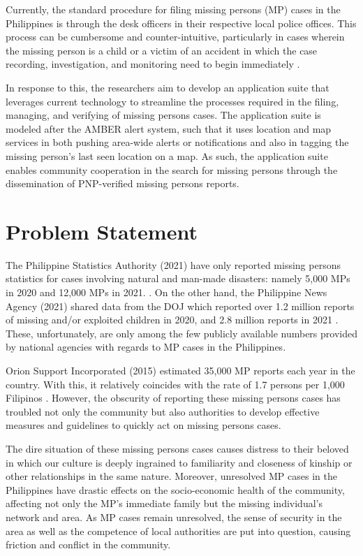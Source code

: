 Currently, the standard procedure for filing missing persons (MP) cases in the Philippines is through the desk officers in their respective local police offices. This process can be cumbersome and counter-intuitive, particularly in cases wherein the missing person is a child or a victim of an accident in which the case recording, investigation, and monitoring need to begin immediately \cite{NationalPoliceCommission}.

In response to this, the researchers aim to develop an application suite that leverages current technology to streamline the processes required in the filing, managing, and verifying of missing persons cases. The application suite is modeled after the AMBER alert system, such that it uses location and map services in both pushing area-wide alerts or notifications and also in tagging the missing person's last seen location on a map. As such, the application suite enables community cooperation in the search for missing persons through the dissemination of PNP-verified missing persons reports. 


\section{Problem Statement}
The Philippine Statistics Authority (2021) have only reported missing persons statistics for cases involving natural and man-made disasters: namely 5,000 MPs in 2020 and 12,000 MPs in 2021. \cite{PSAOpenStat}. On the other hand, the Philippine News Agency (2021) shared data from the DOJ which reported over 1.2 million reports of missing and/or exploited children in 2020, and 2.8 million reports in 2021 \cite{pulta_2021}. These, unfortunately, are only among the few publicly available numbers provided by national agencies with regards to MP cases in the Philippines.

Orion Support Incorporated (2015) estimated 35,000 MP reports each year in the country. With this, it relatively coincides with the rate of 1.7 persons per 1,000 Filipinos \cite{orion_2021}. However, the obscurity of reporting these missing persons cases has troubled not only the community but also authorities to develop effective measures and guidelines to quickly act on missing persons cases.

The dire situation of these missing persons cases causes distress to their beloved in which our culture is deeply ingrained to familiarity and closeness of kinship or other relationships in the same nature.  Moreover, unresolved MP cases in the Philippines have drastic effects on the socio-economic health of the community, affecting not only the MP’s immediate family but the missing individual’s network and area. As MP cases remain unresolved, the sense of security in the area as well as the competence of local authorities are put into question, causing friction and conflict in the community. 

